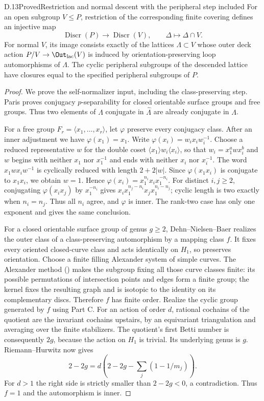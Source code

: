 \begin{claim}{D.13}{Proved}{Restriction and normal descent with the peripheral step included}
For an open subgroup $V\leq P$, restriction of the corresponding finite covering defines an injective map
\[
 \operatorname{Discr}(P)\longrightarrow\operatorname{Discr}(V),
 \qquad\Delta\longmapsto\Delta\cap V.
\]
For normal $V$, its image consists exactly of the lattices $\Lambda\subset V$ whose outer deck action $P/V\to\Out_{\rm lac}(V)$ is induced by orientation-preserving loop automorphisms of $\Lambda$. The cyclic peripheral subgroups of the descended lattice have closures equal to the specified peripheral subgroups of $P$.
\end{claim}
\begin{proof}
We prove the self-normalizer input, including the class-preserving step. Paris \cite[Theorems 1.7 and 3.2]{R-Paris} proves conjugacy $p$-separability for closed orientable surface groups and free groups. Thus two elements of $\Lambda$ conjugate in $\widehat\Lambda$ are already conjugate in $\Lambda$.

For a free group $F_r=\langle x_1,\ldots,x_r\rangle$, let $\varphi$ preserve every conjugacy class. After an inner adjustment we have $\varphi(x_1)=x_1$. Write $\varphi(x_i)=w_ix_iw_i^{-1}$. Choose a reduced representative $w$ for the double coset $\langle x_1\rangle w_i\langle x_i\rangle$, so that $w_i=x_1^awx_i^b$ and $w$ begins with neither $x_1$ nor $x_1^{-1}$ and ends with neither $x_i$ nor $x_i^{-1}$. The word $x_1wx_iw^{-1}$ is cyclically reduced with length $2+2|w|$. Since $\varphi(x_1x_i)$ is conjugate to $x_1x_i$, we obtain $w=1$. Hence
$\varphi(x_i)=x_1^{n_i}x_ix_1^{-n_i}$. For distinct $i,j\geq2$, conjugating $\varphi(x_ix_j)$ by $x_1^{-n_i}$ gives
$x_i x_1^{n_j-n_i}x_jx_1^{n_i-n_j}$; cyclic length is two exactly when $n_i=n_j$. Thus all $n_i$ agree, and $\varphi$ is inner. The rank-two case has only one exponent and gives the same conclusion.

For a closed orientable surface group of genus $g\geq2$, Dehn--Nielsen--Baer realizes the outer class of a class-preserving automorphism by a mapping class $f$. It fixes every oriented closed-curve class and acts identically on $H_1$, so preserves orientation. Choose a finite filling Alexander system of simple curves. The Alexander method (\cite[\S2.3]{R-FarbMargalit}) makes the subgroup fixing all those curve classes finite: its possible permutations of intersection points and edges form a finite group; the kernel fixes the resulting graph and is isotopic to the identity on its complementary discs. Therefore $f$ has finite order. Realize the cyclic group generated by $f$ using Part C. For an action of order $d$, rational cochains of the quotient are the invariant cochains upstairs, by an equivariant triangulation and averaging over the finite stabilizers. The quotient's first Betti number is consequently $2g$, because the action on $H_1$ is trivial. Its underlying genus is $g$. Riemann--Hurwitz now gives
\[
 2-2g=d\left(2-2g-\sum_j(1-1/m_j)\right).
\]
For $d>1$ the right side is strictly smaller than $2-2g<0$, a contradiction. Thus $f=1$ and the automorphism is inner.


\end{proof}
